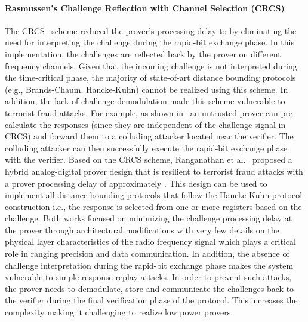 \documentclass{sig-alternate-10pt}
\newcommand{\ie}{i.e.,\xspace}
\begin{document}
\paragraph{Rasmussen's Challenge Reflection with Channel Selection (CRCS)}
The CRCS~\cite{RasmussenAug10} scheme reduced the prover's processing delay to
 by eliminating the need for interpreting the challenge during the
rapid-bit exchange phase. In this implementation, the challenges are reflected
back by the prover on different frequency channels. Given that the incoming
challenge is not interpreted during the time-critical phase, the majority of
state-of-art distance bounding protocols (e.g., Brands-Chaum, Hancke-Kuhn)
cannot be realized using this scheme. In addition, the lack of challenge
demodulation made this scheme vulnerable to terrorist fraud attacks. For
example, as shown in~\cite{RanganathanSep12} an untrusted prover can
pre-calculate the responses (since they are independent of the challenge signal
in CRCS) and forward them to a colluding attacker located near the verifier. The
colluding attacker can then successfully execute the rapid-bit exchange phase
with the verifier. Based on the CRCS scheme, Ranganathan et
al.~\cite{RanganathanSep12} proposed a hybrid analog-digital prover design that
is resilient to terrorist fraud attacks with a prover processing delay of
approximately . This design can be used to implement all distance
bounding protocols that follow the Hancke-Kuhn protocol construction \ie the
response is selected from one or more registers based on the challenge. Both
works focused on minimizing the challenge processing delay at the prover through
architectural modifications with very few details on the physical layer
characteristics of the radio frequency signal which plays a critical role in
ranging precision and data communication. In addition, the absence of challenge
interpretation during the rapid-bit exchange phase makes the system vulnerable
to simple response replay attacks. In order to prevent such attacks, the prover
needs to demodulate, store and communicate the challenges back to the verifier
during the final verification phase of the protocol. This increases the
complexity making it challenging to realize low power provers.
\end{document}

